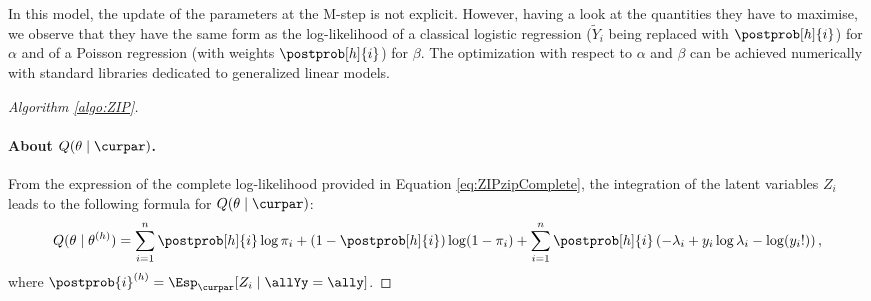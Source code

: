 \remark 
In this model, the update of the parameters at the M-step is not explicit. However, having a look at the quantities they have to maximise, we observe that they  have the same form as the log-likelihood of a classical logistic regression ($\widetilde{Y}_i$ being replaced with $\postprob[h]{i}$) for $\alpha$  and of a Poisson regression (with weights $\postprob[h]{i}$) for $\beta$. The optimization with respect to $\alpha$ and $\beta$ can be achieved numerically with standard libraries dedicated to generalized linear models.

\begin{proof}[Algorithm \ref{algo:ZIP}]

\paragraph{About $Q(\theta \mid \curpar)$.}
From the expression of the complete log-likelihood provided in Equation \eqref{eq:ZIPzipComplete}, the integration of the latent variables $Z_i$ leads to the following formula for $Q(\theta \mid \curpar)$: 
\begin{equation}\label{eq:ZIPQ}
Q(\theta \mid \theta^{(h)})
= \sum_{i=1}^n \postprob[h]{i} \log \pi_i + (1 - \postprob[h]{i}) \log(1- \pi_i) 
+\sum_{i=1}^n \postprob[h]{i} \left(-\lambda_i + y_i \log \lambda_i - \log(y_i!)\right),
\end{equation}
where 
$\postprob{i}^{(h)} = \Esp_{\curpar}[Z_i \mid \allYy=\ally]$. 



\end{proof}
